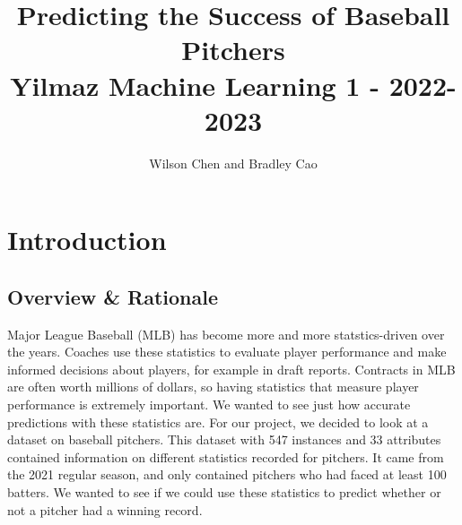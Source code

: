 \documentclass[12pt]{article}
\title{Predicting the Success of Baseball Pitchers \\ 
        \large Yilmaz Machine Learning 1 - 2022-2023}
\author{Wilson Chen and Bradley Cao}
\date{}
\begin{document}
\maketitle
\newpage{}
\tableofcontents
\newpage
\section{Introduction}
\subsection{Overview \& Rationale}
Major League Baseball (MLB) has become more and more statstics-driven over the years. Coaches use these statistics to evaluate player performance and make informed decisions about players, for example in draft reports. Contracts in MLB are often worth millions of dollars, so having statistics that measure player performance is extremely important. We wanted to see just how accurate predictions with these statistics are. For our project, we decided to look at a dataset on baseball pitchers. This dataset with 547 instances and 33 attributes contained information on different statistics recorded for pitchers. It came from the 2021 regular season, and only contained pitchers who had faced at least 100 batters. We wanted to see if we could use these statistics to predict whether or not a pitcher had a winning record. 
\end{document}
